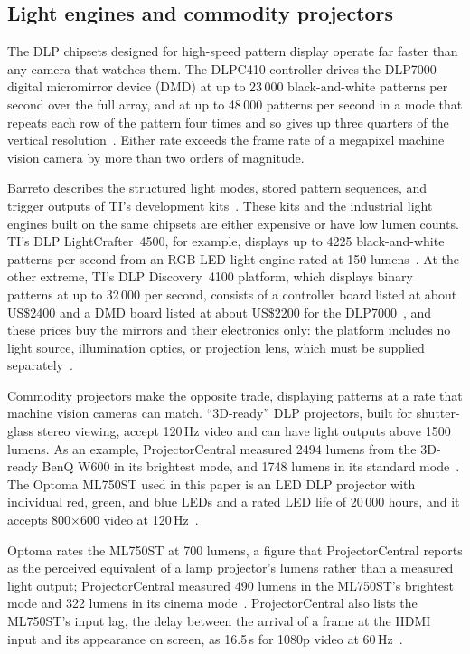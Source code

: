 \documentclass[10pt,journal,compsoc]{IEEEtran}
\newcommand{\SI}[2]{#1\,#2}
\newcommand{\second}{s}\newcommand{\hertz}{Hz}\newcommand{\metre}{m}
\begin{document}
\subsection{Light engines and commodity projectors}
\label{sec:rw_engines}
The DLP chipsets designed for high-speed pattern display operate far faster than any camera that
watches them. The DLPC410 controller drives the DLP7000 digital micromirror device (DMD) at up to
23\,000 black-and-white patterns per second over the full array, and at up to 48\,000 patterns
per second in a mode that repeats each row of the pattern four times and so gives up three
quarters of the vertical resolution~\cite{ti_dlpc410,ti_dlp7000}. Either rate exceeds the frame
rate of a megapixel machine vision camera by more than two orders of magnitude.

Barreto describes the structured light modes, stored pattern sequences, and trigger outputs of
TI's development kits~\cite{barreto2011dlp}. These kits and the industrial light engines built on
the same chipsets are either expensive or have low lumen counts. TI's DLP LightCrafter~4500, for
example, displays up to 4225 black-and-white patterns per second from an RGB LED light engine
rated at 150 lumens~\cite{ti_dlplcr4500evm}. At the other extreme, TI's DLP Discovery~4100
platform, which displays binary patterns at up to 32\,000 per second, consists of a controller
board listed at about US\$2400 and a DMD board listed at about US\$2200 for the
DLP7000~\cite{ti_dlpu040,mouser_d4100}, and these prices buy the mirrors and their electronics
only: the platform includes no light source, illumination optics, or projection lens, which must
be supplied separately~\cite{ti_dlpu040}.

Commodity projectors make the opposite trade, displaying patterns at a rate that machine vision
cameras can match. ``3D-ready'' DLP projectors, built for shutter-glass stereo viewing, accept
\SI{120}{\hertz} video and can have light outputs above 1500 lumens. As an example,
ProjectorCentral measured 2494 lumens from the 3D-ready BenQ W600 in its brightest mode, and 1748
lumens in its standard mode~\cite{pc_benq_w600}. The Optoma ML750ST used in this paper is an LED
DLP projector with individual red, green, and blue LEDs and a rated LED life of 20\,000 hours, and
it accepts 800$\times$600 video at \SI{120}{\hertz}~\cite{optoma_ml750st,pc_ml750st_specs}.

Optoma rates the ML750ST at 700 lumens, a figure that ProjectorCentral reports as the perceived
equivalent of a lamp projector's lumens rather than a measured light output; ProjectorCentral
measured 490 lumens in the ML750ST's brightest mode and 322 lumens in its cinema
mode~\cite{pc_ml750st_review}. ProjectorCentral also lists the ML750ST's input lag, the delay
between the arrival of a frame at the HDMI input and its appearance on screen, as
\SI{16.5}{\milli\second} for 1080p video at \SI{60}{\hertz}~\cite{pc_ml750st_specs}.
\end{document}
